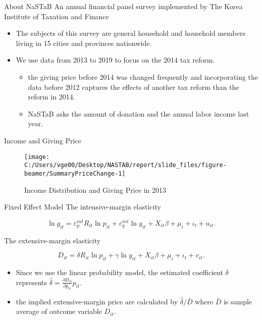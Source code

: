 \documentclass[
  ignorenonframetext,
  aspectratio=169,
]{beamer}
\providecommand{\tightlist}{%
  \setlength{\itemsep}{0pt}\setlength{\parskip}{0pt}}
\begin{document}
\begin{frame}{About NaSTaB}
\protect\hypertarget{about-nastab}{}
An annual financial panel survey implemented by The Korea Institute of Taxation and Finance

\begin{itemize}
\tightlist
\item
  The subjects of this survey are general household and household members living in 15 cities and provinces nationwide.
\item
  We use data from 2013 to 2019 to focus on the 2014 tax reform.

  \begin{itemize}
  \tightlist
  \item
    the giving price before 2014 was changed frequently and incorporating the data before 2012 captures the effects of another tax reform than the reform in 2014.
  \item
    NaSTaB asks the amount of donation and the annual labor income last year.
  \end{itemize}
\end{itemize}
\end{frame}

\begin{frame}{Income and Giving Price}
\protect\hypertarget{income-and-giving-price}{}
\begin{figure}[t]

{\centering \texttt{[image: C:/Users/vge00/Desktop/NASTAB/report/slide\_files/figure-beamer/SummaryPriceChange-1]} 

}

\caption{Income Distribution and Giving Price in 2013}\label{fig:SummaryPriceChange}
\end{figure}
\end{frame}

\begin{frame}{Fixed Effect Model}
\protect\hypertarget{fixed-effect-model}{}
The intensive-margin elasticity

\begin{equation}
    \ln g_{it} = \varepsilon^{int}_p R_{it} \ln p_{it} + \varepsilon^{int}_y \ln y_{it} 
    + X_{it}\beta +\mu_i +\iota_t +u_{it}. \label{eq:intensive}
\end{equation}

The extensive-margin elasticity

\begin{equation}
D_{it} =  \delta R_{it} \ln p_{it} +\gamma \ln y_{it} + X_{it}\beta +\mu_i  +\iota_t +v_{it}. \label{eq:extensive}
\end{equation}

\begin{itemize}
\tightlist
\item
  Since we use the linear probability model, the estimated coefficient \(\delta\) represents \(\hat{\delta} = \frac{\partial D_{it}}{\partial p_{it}} p_{it}\).
\item
  the implied extensive-margin price are calculated by \(\hat{\delta}/\bar{D}\) where \(\bar{D}\) is sample average of outcome variable \(D_{it}\).
\end{itemize}
\end{frame}
\end{document}
